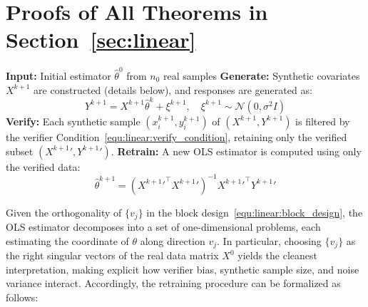 \clearpage

\section{Proofs of All Theorems in Section~\ref{sec:linear}}\label{app:linear}
\begin{algorithm}[H]
\captionsetup{labelfont=bf, name=Scheme} %
\caption{Iterative  Retraining with Verified Synthetic Data \protect \footnotemark}
\label{scheme:linear_retraining}
\begin{algorithmic}[1]
\State \textbf{Input:} Initial estimator $\hat{\theta}^0$ from $n_0$ real samples
    \State \textbf{Generate:} Synthetic covariates $X^{k+1}$ are constructed (details below), and responses are generated as:
        \[
        Y^{k+1} = X^{k+1}\hat{\theta}^k + \xi^{k+1}, \quad 
        \xi^{k+1}\sim \mathcal{N}(0,\sigma^2 I)
        \]
    \State \textbf{Verify:} Each synthetic sample $(x_i^{k+1}, y_i^{k+1})$ of $(X^{k+1}, Y^{k+1})$ is filtered by the verifier Condition~\eqref{equ:linear:verify_condition}, retaining only the verified subset $({X^{k+1}}', {Y^{k+1}}')$.
    \State \textbf{Retrain:} A new OLS estimator is computed using only the verified data:
        \[
        \hat{\theta}^{k+1} = ({{X^{k+1}}'}^\top {X^{k+1}}')^{-1} {{X^{k+1}}'}^\top {Y^{k+1}}'
        \]
\EndFor
\end{algorithmic}
\end{algorithm}


Given the orthogonality of $\{v_j\}$ in the block design~\eqref{equ:linear:block_design}, the OLS estimator decomposes into a set of one-dimensional problems, each estimating the coordinate of $\theta$ along direction $v_j$.
In particular, choosing $\{v_j\}$ as the right singular vectors of the real data matrix $X^0$ yields the cleanest interpretation, making explicit how verifier bias, synthetic sample size, and noise variance interact.
Accordingly, the retraining procedure can be formalized as follows:

